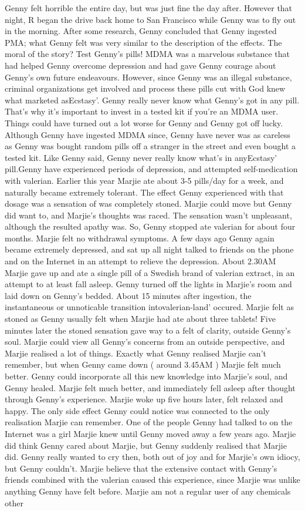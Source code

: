 \documentclass[12pt]{book}
\begin{document}
Genny felt horrible the entire day, but was just fine the day after. However that night, R began the drive back home to San Francisco while Genny was to fly out in the morning. After some research, Genny concluded that Genny ingested PMA; what Genny felt was very similar to the description of the effects. The moral of the story? Test Genny's pills! MDMA was a marvelous substance that had helped Genny overcome depression and had gave Genny courage about Genny's own future endeavours. However, since Genny was an illegal substance, criminal organizations get involved and process these pills cut with God knew what marketed asEcstasy'. Genny really never know what Genny's got in any pill. That's why it's important to invest in a tested kit if you're an MDMA user. Things could have turned out a lot worse for Genny and Genny got off lucky. Although Genny have ingested MDMA since, Genny have never was as careless as Genny was bought random pills off a stranger in the street and even bought a tested kit. Like Genny said, Genny never really know what's in anyEcstasy' pill.Genny have experienced periods of depression, and attempted self-medication with valerian. Earlier this year Marjie ate about 3-5 pills/day for a week, and naturally became extremely tolerant. The effect Genny experienced with that dosage was a sensation of was completely stoned. Marjie could move but Genny did want to, and Marjie's thoughts was raced. The sensation wasn't unpleasant, although the resulted apathy was. So, Genny stopped ate valerian for about four months. Marjie felt no withdrawal symptoms. A few days ago Genny again became extremely depressed, and sat up all night talked to friends on the phone and on the Internet in an attempt to relieve the depression. About 2.30AM Marjie gave up and ate a single pill of a Swedish brand of valerian extract, in an attempt to at least fall asleep. Genny turned off the lights in Marjie's room and laid down on Genny's bedded. About 15 minutes after ingestion, the instantaneous or unnoticable transition intovalerian-land' occured. Marjie felt as stoned as Genny usually felt when Marjie had ate about three tablets! Five minutes later the stoned sensation gave way to a felt of clarity, outside Genny's soul. Marjie could view all Genny's concerns from an outside perspective, and Marjie realised a lot of things. Exactly what Genny realised Marjie can't remember, but when Genny came down ( around 3.45AM ) Marjie felt much better. Genny could incorporate all this new knowledge into Marjie's soul, and Genny healed. Marjie felt much better, and immediately fell asleep after thought through Genny's experience. Marjie woke up five hours later, felt relaxed and happy. The only side effect Genny could notice was connected to the only realisation Marjie can remember. One of the people Genny had talked to on the Internet was a girl Marjie knew until Genny moved away a few years ago. Marjie did think Genny cared about Marjie, but Genny suddenly realised that Marjie did. Genny really wanted to cry then, both out of joy and for Marjie's own idiocy, but Genny couldn't. Marjie believe that the extensive contact with Genny's friends combined with the valerian caused this experience, since Marjie was unlike anything Genny have felt before. Marjie am not a regular user of any chemicals other 
\end{document}
